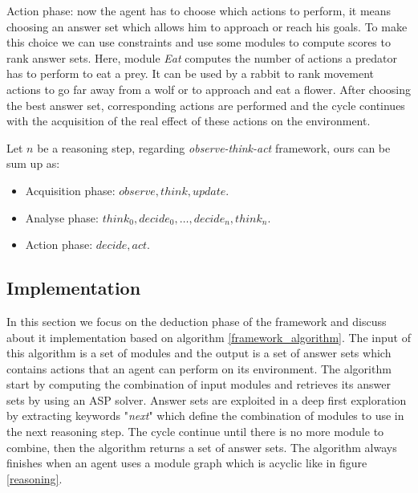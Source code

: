 \documentclass{aamas2012}
\begin{document}
	Action phase: now the agent has to choose which actions to perform, it means choosing an answer set which allows him to approach or reach his goals.
	To make this choice we can use constraints and use some modules to compute scores to rank answer sets.
	Here, module \emph{Eat} computes the number of actions a predator has to perform to eat a prey.
	It can be used by a rabbit to rank movement actions to go far away from a wolf or to approach and eat a flower.
	After choosing the best answer set, corresponding actions are performed and 
	the cycle continues with the acquisition of the real effect of these actions on the environment.

	Let $n$ be a reasoning step, regarding \emph{observe-think-act} framework, ours can be sum up as:
	\begin{itemize}
		\item Acquisition phase: $observe, think, update$.
		\item Analyse phase: $think_{0}, decide_{0}, \ldots, decide_{n}, think_{n}$.
		\item Action phase: $decide, act$.
	\end{itemize}
\subsection{Implementation}

	In this section we focus on the deduction phase of the framework and discuss about it implementation based on algorithm \ref{framework_algorithm}.
	The input of this algorithm is a set of modules and the output is a set of answer sets which contains actions that an agent can perform on its environment.
	The algorithm start by computing the combination of input modules and retrieves its answer sets by using an ASP solver.
	Answer sets are exploited in a deep first exploration by extracting keywords "\emph{next}" which define the combination of modules to use in the next reasoning step.
	The cycle continue until there is no more module to combine, then the algorithm returns a set of answer sets.
	The algorithm always finishes when an agent uses a module graph which is acyclic like in figure \ref{reasoning}.
\end{document}
